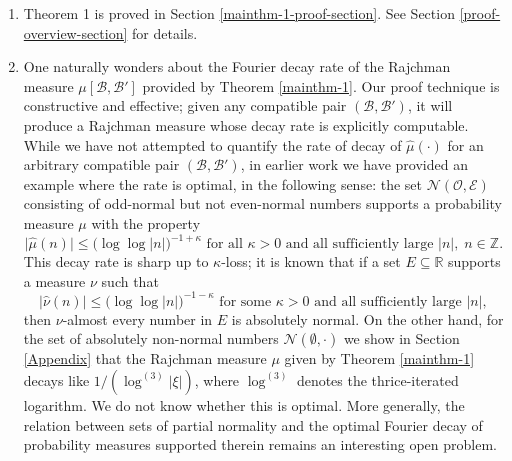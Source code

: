 \documentclass[12pt, twoside]{article}
\theoremstyle{definition}
\numberwithin{equation}{section}
\begin{document}
\begin{enumerate}[1.]
\item Theorem 1 is proved in Section \ref{mainthm-1-proof-section}. See Section \ref{proof-overview-section} for details.  
\item One naturally wonders about the Fourier decay rate of the Rajchman measure $\mu[\mathscr{B}, \mathscr{B}']$ provided by Theorem \ref{mainthm-1}. Our proof technique is constructive and effective; given any compatible pair $(\mathscr{B}, \mathscr{B}')$, it will produce a Rajchman measure whose decay rate is explicitly computable. While we have not attempted to quantify the rate of decay of  $\widehat{\mu}(\cdot)$ for an arbitrary compatible pair $(\mathscr{B}, \mathscr{B}')$, in earlier work \cite{PZ-1} we have provided an example where the rate is optimal, in the following sense: the set $\mathscr{N}(\mathscr{O}, \mathscr{E})$ consisting of odd-normal but not even-normal numbers supports a probability measure $\mu$ with the property
\[ \bigl| \widehat{\mu}(n) \bigr| \leq \bigl(\log \log |n| \bigr)^{-1 + \kappa} \text{ for all } \kappa > 0 \text{ and all sufficiently large } |n|, \; n \in \mathbb Z. \]    
This decay rate is sharp up to $\kappa$-loss; it is known \cite[Remark 1, page 8573]{PVZZ} that if a set $E \subseteq \mathbb R$ supports a measure $\nu$ such that 
\[ \bigl| \widehat{\nu}(n) \bigr| \leq  \bigl(\log \log |n| \bigr)^{-1 - \kappa} \text{ for some } \kappa > 0 \text{ and all sufficiently large } |n|,  \]
then $\nu$-almost every number in $E$ is absolutely normal.   
\vskip0.1in 
\noindent  On the other hand, for the set of absolutely non-normal numbers $\mathscr{N}(\emptyset, \cdot)$ we show in Section \ref{Appendix} that the Rajchman measure $\mu$ given by Theorem \ref{mainthm-1} decays like $1/(\log^{(3)}|\xi|)$, where $\log^{(3)}$ denotes the thrice-iterated logarithm. We do not know whether this is optimal. More generally, the relation between sets of partial normality and the optimal Fourier decay of probability measures supported therein remains an interesting open problem. 
\end{enumerate} 
\end{document}
